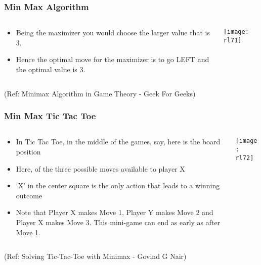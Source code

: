 \begin{frame}[fragile]\frametitle{Min Max Algorithm}


\begin{columns}
\begin{column}{0.5\textwidth}
\begin{itemize}
\item Being the maximizer you would choose the larger value that is 3. 
\item Hence the optimal move for the maximizer is to go LEFT and the optimal value is 3.
\end{itemize}

\end{column}
\begin{column}{0.5\textwidth}  %
\begin{center}
\texttt{[image: rl71]}
\end{center}
\end{column}
\end{columns}

{\tiny (Ref: Minimax Algorithm in Game Theory - Geek For Geeks)}

\end{frame}

\begin{frame}[fragile]\frametitle{Min Max Tic Tac Toe}


\begin{columns}
\begin{column}{0.5\textwidth}
\begin{itemize}
\item In Tic Tac Toe, in the middle of the games, say, here is the board position
\item Here, of the three possible moves available to player X
\item  ‘X’ in the center square is the only action that leads to a winning outcome
\item Note that Player X makes Move 1, Player Y makes Move 2 and Player X makes Move 3. This mini-game can end as early as after Move 1.
\end{itemize}

\end{column}
\begin{column}{0.5\textwidth}  %
\begin{center}
\texttt{[image: rl72]}
\end{center}
\end{column}
\end{columns}

{\tiny (Ref: Solving Tic-Tac-Toe with Minimax - Govind G Nair)}

\end{frame}

